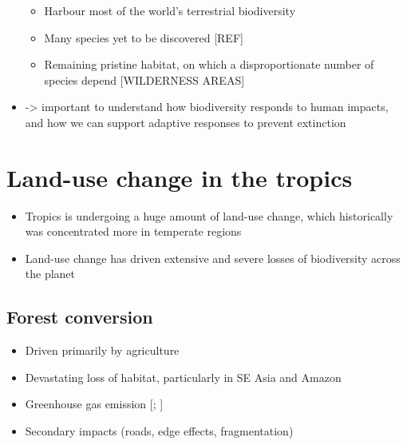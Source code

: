 \documentclass[12pt,a4paper,]{report}
\providecommand{\tightlist}{%
  \setlength{\itemsep}{0pt}\setlength{\parskip}{0pt}}
\theoremstyle{definition}
\theoremstyle{definition}
\theoremstyle{definition}
\theoremstyle{remark}
\begin{document}
\begin{itemize}
  \begin{itemize}
  \tightlist
  \item
    Harbour most of the world's terrestrial biodiversity
    \citep{jenkins_global_2013}
  \item
    Many species yet to be discovered {[}REF{]}
  \item
    Remaining pristine habitat, on which a disproportionate number of
    species depend {[}WILDERNESS AREAS{]}
  \end{itemize}
\item
  -\textgreater{} important to understand how biodiversity responds to
  human impacts, and how we can support adaptive responses to prevent
  extinction
\end{itemize}

\section{Land-use change in the
tropics}\label{land-use-change-in-the-tropics}

\begin{itemize}
\tightlist
\item
  Tropics is undergoing a huge amount of land-use change, which
  historically was concentrated more in temperate regions
  \citep{gibbs_tropical_2010, foley_solutions_2011}
\item
  Land-use change has driven extensive and severe losses of biodiversity
  across the planet \citep{newbold_global_2015}
\end{itemize}

\subsection{Forest conversion}\label{forest-conversion}

\begin{itemize}
\tightlist
\item
  Driven primarily by agriculture \citep{godfray_food_2010}
\item
  Devastating loss of habitat, particularly in SE Asia and Amazon
  \citep{gibbs_tropical_2010, hansen_high-resolution_2013}
\item
  Greenhouse gas emission {[}\citet{foley_global_2005};
  \citep{ipcc_climate_2013}{]}
\item
  Secondary impacts (roads, edge effects, fragmentation)
  \citep{laurance_impacts_2009, murcia_edge_1995, pfeifer_creation_2017, ewers_fragmentation_2013}
\end{itemize}
\end{document}
